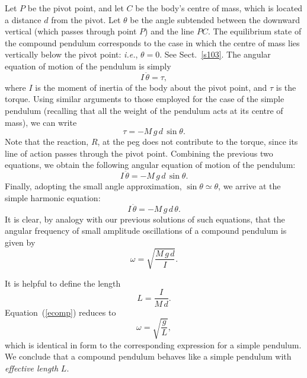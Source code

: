 Let $P$ be the pivot point, and let $C$ be the body's centre of mass, which is located a distance $d$ from the
pivot. Let $\theta$ be the angle subtended between the downward vertical (which passes through point $P$) and the
line $PC$. The equilibrium state of the compound pendulum corresponds to the case in which the centre of
mass lies  vertically below the pivot point: {\em i.e.}, $\theta=0$. See Sect.~\ref{s103}.
The angular equation of motion of the pendulum is simply
\begin{equation}
I\,\ddot{\theta} = \tau,
\end{equation}
where $I$ is the moment of inertia of the body about the pivot point, and $\tau$ is the torque.
Using similar arguments to those employed for the case of the simple pendulum (recalling that all
the weight of the pendulum acts at its centre of mass), we can write
\begin{equation}
\tau = - M\,g\,d\,\sin\theta.
\end{equation}
Note that the reaction, $R$, at the peg does not contribute to the torque, since its line of action passes
through the pivot point.
Combining the previous two equations, we obtain the following  angular equation of motion of the pendulum:
\begin{equation}
I\,\ddot{\theta} = - M\,g\,d\,\sin\theta.
\end{equation}
Finally, adopting the small angle approximation, $\sin\theta \simeq \theta$, we arrive at the
 simple harmonic equation:
\begin{equation}
I\,\ddot{\theta} = - M\,g\,d\,\theta.
\end{equation}
It is clear, by analogy with our previous solutions of such equations, that the angular frequency of small
amplitude oscillations of a compound pendulum is given by
\begin{equation}\label{ecomp}
\omega = \sqrt{\frac{M\,g\,d}{I}}.
\end{equation}

It is helpful to  define the length
\begin{equation}
L = \frac{I}{M\,d}.
\end{equation}
Equation~(\ref{ecomp})  reduces to
\begin{equation}
\omega = \sqrt{\frac{g}{L}},
\end{equation}
which is identical in form to the corresponding expression for a simple pendulum. We conclude that a
compound pendulum behaves like a simple pendulum with {\em effective length} $L$. 

